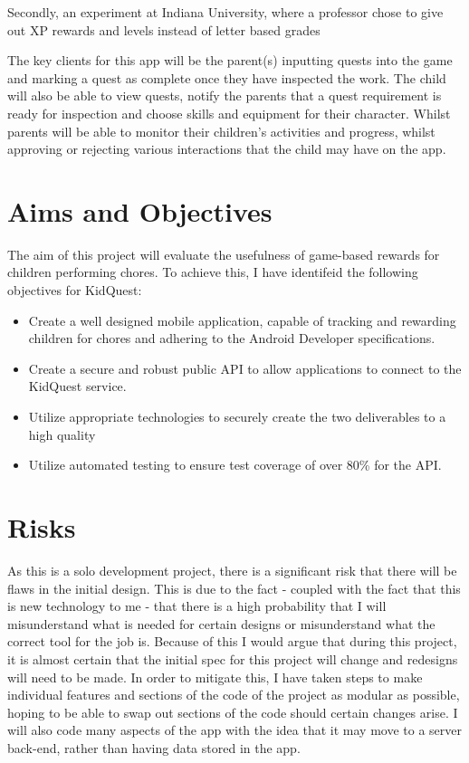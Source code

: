 Secondly, an experiment at Indiana University, where a professor chose to give out XP rewards and levels instead of letter based grades \cite{sheldon2011multiplayer} 

The key clients for this app will be the parent(s) inputting quests into the game and marking a quest as complete once they have inspected the work. 
The child will also be able to view quests, notify the parents that a quest requirement is ready for inspection and choose skills and equipment for their character. 
Whilst parents will be able to monitor their children's activities and progress, whilst approving or rejecting various interactions that the child may have on the app.

\section{Aims and Objectives}
The aim of this project will evaluate the usefulness of game-based rewards for children performing chores. 
To achieve this, I have identifeid the following objectives for KidQuest:

\begin{itemize}
	\item Create a well designed mobile application, capable of tracking and rewarding children for chores and adhering to the Android Developer specifications.
	\item Create a secure and robust public API to allow applications to connect to the KidQuest service.
	\item Utilize appropriate technologies to securely create the two deliverables to a high quality
	\item Utilize automated testing to ensure test coverage of over 80\% for the API.
\end{itemize}

\section{Risks}
As this is a solo development project, there is a significant risk that there will be flaws in the initial design. 
This is due to the fact - coupled with the fact that this is new technology to me - that there is a high probability that I will misunderstand what is needed for certain designs or misunderstand what the correct tool for the job is.
Because of this I would argue that during this project, it is almost certain that the initial spec for this project will change and redesigns will need to be made. 
In order to mitigate this, I have taken steps to make individual features and sections of the code of the project as modular as possible, hoping to be able to swap out sections of the code should certain changes arise.
I will also code many aspects of the app with the idea that it may move to a server back-end, rather than having data stored in the app. 
 
